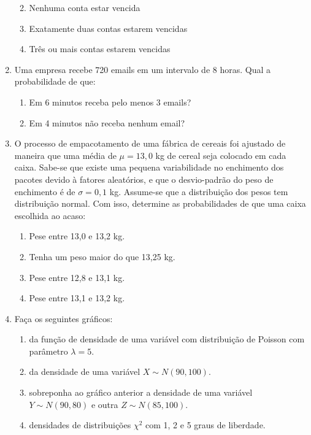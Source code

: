 \documentclass[
  10pt,
  a4paper]{book}
\providecommand{\tightlist}{%
  \setlength{\itemsep}{0pt}\setlength{\parskip}{0pt}}
\begin{document}
\begin{enumerate}
  \begin{enumerate}
  \def\labelenumii{\alph{enumii}.}
  \tightlist
  \item
    Nenhuma conta estar vencida
  \item
    Exatamente duas contas estarem vencidas
  \item
    Três ou mais contas estarem vencidas
  \end{enumerate}
\item
  Uma empresa recebe 720 emails em um intervalo de 8 horas. Qual a probabilidade de que:

  \begin{enumerate}
  \def\labelenumii{\alph{enumii}.}
  \tightlist
  \item
    Em 6 minutos receba pelo menos 3 emails?
  \item
    Em 4 minutos não receba nenhum email?
  \end{enumerate}
\item
  O processo de empacotamento de uma fábrica de cereais foi ajustado de maneira que uma média de \(\mu = 13,0\) kg de cereal seja colocado em cada caixa. Sabe-se que existe uma pequena variabilidade no enchimento dos pacotes devido à fatores aleatórios, e que o desvio-padrão do peso de enchimento é de \(\sigma = 0,1\) kg. Assume-se que a distribuição dos pesos tem distribuição normal. Com isso, determine as probabilidades de que uma caixa escolhida ao acaso:

  \begin{enumerate}
  \def\labelenumii{\alph{enumii}.}
  \tightlist
  \item
    Pese entre 13,0 e 13,2 kg.
  \item
    Tenha um peso maior do que 13,25 kg.
  \item
    Pese entre 12,8 e 13,1 kg.
  \item
    Pese entre 13,1 e 13,2 kg.
  \end{enumerate}
\item
  Faça os seguintes gráficos:

  \begin{enumerate}
  \def\labelenumii{\alph{enumii}.}
  \tightlist
  \item
    da função de densidade de uma variável com distribuição de Poisson com parâmetro \(\lambda = 5\).
  \item
    da densidade de uma variável \(X \sim N(90, 100)\).
  \item
    sobreponha ao gráfico anterior a densidade de uma variável \(Y \sim N(90, 80)\) e outra \(Z \sim N(85, 100)\).
  \item
    densidades de distribuições \(\chi^2\) com 1, 2 e 5 graus de liberdade.
  \end{enumerate}
\end{enumerate}
\end{document}
